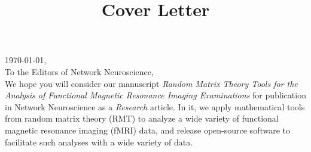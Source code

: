 \documentclass[10pt,a4paper]{article}
\begin{document}
% 
\thispagestyle{nofooter}  %
\setlength{\headheight}{30.0pt}
\normalsize

\title{Cover Letter}





\noindent
\today, \\
To the Editors of Network Neuroscience, \\

We hope you will consider our manuscript \emph{Random Matrix Theory Tools for the Analysis of
Functional Magnetic Resonance Imaging Examinations} for publication in Network Neuroscience as a
\emph{Research} article. In it, we apply mathematical tools from random matrix theory (RMT) to
analyze a wide variety of functional magnetic resonance imaging (fMRI) data, and release
open-source software \citep{bergerStfxecutablesEmpyricalRMTPreliminary2020} to facilitate such analyses with a wide variety of data.
\end{document}
